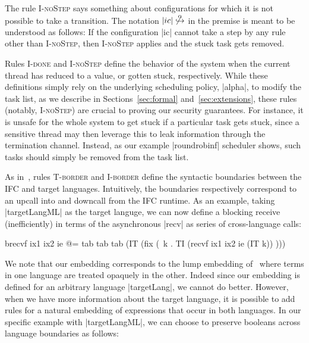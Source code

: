 The rule \textsc{I-noStep} says something about configurations for which
it is not possible to take a transition.  The notation
$|ic|\not\overset{\alpha}{\hookrightarrow}$ in the premise
is meant to be understood as
follows:  If the configuration |ic| cannot take a step by any rule other
than \textsc{I-noStep}, then \textsc{I-noStep} applies and the
stuck task gets removed.

Rules \textsc{I-done} and \textsc{I-noStep} define the behavior of the system
when the current thread has reduced to a value, or gotten stuck, respectively.
%
While these definitions simply rely on the underlying scheduling policy,
|alpha|, to modify the task list, as we describe in Sections~\ref{sec:formal}
and~\ref{sec:extensions}, these rules (notably, \textsc{I-noStep}) are crucial
to proving our security guarantees.
%
For instance, it is unsafe for the whole system to get stuck if a particular
task gets stuck, since a sensitive thread may then leverage this to leak
information through the termination channel.
%
Instead, as our example |roundrobinf| scheduler shows, such tasks should simply
be removed from the task list.

%
As in~\cite{Matthews:2007:OSM:1190216.1190220}, rules \textsc{T-border} and
\textsc{I-border} define the syntactic boundaries between the IFC and target
languages.
%
Intuitively, the boundaries respectively correspond to an upcall into and
downcall from the IFC runtime.
%
As an example, taking |targetLangML| as the target languge, we can now define a
blocking receive (inefficiently) in terms of the asynchronous |recv| as series
of cross-language calls:
\begin{code}
  brecvf ix1 ix2 ie @=
  tab tab tab (IT (fix (\ k . TI (recvf ix1 ix2 ie (IT k)) )))
\end{code}

We note that our embedding corresponds to the lump embedding
of~\cite{Matthews:2007:OSM:1190216.1190220} where terms in one language are
treated opaquely in the other.
%
Indeed since our embedding is defined for an arbitrary language |targetLang|,
we cannot do better.
%
However, when we have more information about the target language, it is
possible to add rules for a natural embedding of expressions that occur in both
languages.  In our specific example with |targetLangML|, we can choose to
preserve booleans across language boundaries as follows:

